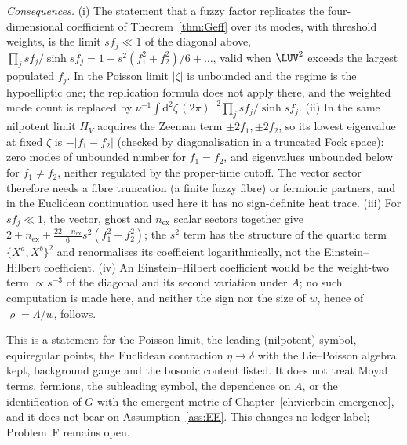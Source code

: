 \emph{Consequences.} (i) The statement that a fuzzy factor replicates the four-dimensional coefficient of Theorem~\ref{thm:Geff} over its modes, with threshold weights, is the limit \(sf_j\ll1\) of the diagonal above, \(\prod_j sf_j/\sinh sf_j=1-s^2(f_1^2+f_2^2)/6+\dots\), valid when \(\LUV^2\) exceeds the largest populated \(f_j\). In the Poisson limit \(|\zeta|\) is unbounded and the regime is the hypoelliptic one; the replication formula does not apply there, and the weighted mode count is replaced by \(\nu^{-1}\int\mathrm d^2\zeta\,(2\pi)^{-2}\prod_j sf_j/\sinh sf_j\). (ii) In the same nilpotent limit \(H_V\) acquires the Zeeman term \(\pm2f_1,\pm2f_2\), so its lowest eigenvalue at fixed \(\zeta\) is \(-|f_1-f_2|\) (checked by diagonalisation in a truncated Fock space): zero modes of unbounded number for \(f_1=f_2\), and eigenvalues unbounded below for \(f_1\ne f_2\), neither regulated by the proper-time cutoff. The vector sector therefore needs a fibre truncation (a finite fuzzy fibre) or fermionic partners, and in the Euclidean continuation used here it has no sign-definite heat trace. (iii) For \(sf_j\ll1\), the vector, ghost and \(n_{\mathrm{ex}}\) scalar sectors together give \(2+n_{\mathrm{ex}}+\tfrac{22-n_{\mathrm{ex}}}{6}s^2(f_1^2+f_2^2)\); the \(s^2\) term has the structure of the quartic term \(\{X^a,X^b\}^2\) and renormalises its coefficient logarithmically, not the Einstein--Hilbert coefficient. (iv) An Einstein--Hilbert coefficient would be the weight-two term \(\propto s^{-3}\) of the diagonal and its second variation under \(A\); no such computation is made here, and neither the sign nor the size of \(w\), hence of \(\varrho=\Lambda/w\), follows.

This is a statement for the Poisson limit, the leading (nilpotent) symbol, equiregular points, the Euclidean contraction \(\eta\to\delta\) with the Lie--Poisson algebra kept, background gauge and the bosonic content listed. It does not treat Moyal terms, fermions, the subleading symbol, the dependence on \(A\), or the identification of \(G\) with the emergent metric of Chapter~\ref{ch:vierbein-emergence}, and it does not bear on Assumption~\ref{ass:EE}. This changes no ledger label; Problem~F remains open.

